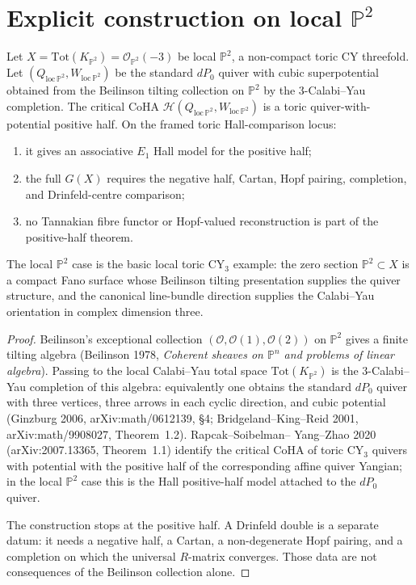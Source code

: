 \section{Explicit construction on local \texorpdfstring{$\mathbb{P}^2$}{P-2}}
\label{sec:cy-c-beyond-local-P2}

\begin{theorem}
\label{thm:cy-c-beyond-local-P2}
Let $X = \mathrm{Tot}(K_{\mathbb{P}^2}) = \mathcal{O}_{\mathbb{P}^2}(-3)$ be local
$\mathbb{P}^2$, a non-compact toric CY threefold. Let
$(Q_{\mathrm{loc}\,\mathbb{P}^2},W_{\mathrm{loc}\,\mathbb{P}^2})$ be the standard
$dP_0$ quiver with cubic superpotential obtained from the Beilinson tilting collection
on $\mathbb P^2$ by the $3$-Calabi--Yau completion. The critical CoHA
$\mathcal{H}(Q_{\mathrm{loc}\,\mathbb{P}^2}, W_{\mathrm{loc}\,\mathbb{P}^2})$ is a
toric quiver-with-potential positive half. On the framed toric
Hall-comparison locus:
\begin{enumerate}[label=\textup{(\roman*)}]
 \item it gives an associative \(E_1\) Hall model for the positive half;
 \item the full \(G(X)\) requires the negative half, Cartan, Hopf
 pairing, completion, and Drinfeld-centre comparison;
 \item no Tannakian fibre functor or Hopf-valued reconstruction is part
 of the positive-half theorem.
\end{enumerate}
The local $\mathbb{P}^2$ case is the basic local toric CY$_3$ example: the zero section
$\mathbb{P}^2 \subset X$ is a compact Fano surface whose Beilinson tilting presentation
supplies the quiver structure, and the canonical line-bundle direction supplies the
Calabi--Yau orientation in complex dimension three.
\end{theorem}

\begin{proof}
Beilinson's exceptional collection
$(\mathcal O,\mathcal O(1),\mathcal O(2))$ on $\mathbb P^2$ gives a finite tilting
algebra (Beilinson 1978, \emph{Coherent sheaves on $\mathbb P^n$ and problems of
linear algebra}). Passing to the local Calabi--Yau total space
$\mathrm{Tot}(K_{\mathbb P^2})$ is the $3$-Calabi--Yau completion of this algebra:
equivalently one obtains the standard $dP_0$ quiver with three vertices, three arrows
in each cyclic direction, and cubic potential (Ginzburg 2006, arXiv:math/0612139,
\S 4; Bridgeland--King--Reid 2001, arXiv:math/9908027, Theorem~1.2). Rapcak--Soibelman--
Yang--Zhao 2020 (arXiv:2007.13365, Theorem~1.1) identify the critical CoHA of toric
CY$_3$ quivers with potential with the positive half of the corresponding affine
quiver Yangian; in the local $\mathbb P^2$ case this is the Hall positive-half model
attached to the $dP_0$ quiver.

The construction stops at the positive half. A Drinfeld double is a
separate datum: it needs a negative half, a Cartan, a non-degenerate Hopf
pairing, and a completion on which the universal \(R\)-matrix converges.
Those data are not consequences of the Beilinson collection alone.
\end{proof}


